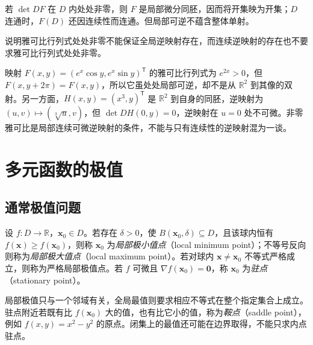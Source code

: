 若 $\det DF$ 在 $D$ 内处处非零，则 $F$ 是局部微分同胚，因而将开集映为开集；$D$ 连通时，$F(D)$ 还因连续性而连通。但局部可逆不蕴含整体单射。

\begin{example}
\label{ex:local-versus-global-invertibility-ch14}
说明雅可比行列式处处非零不能保证全局逆映射存在，而连续逆映射的存在也不要求雅可比行列式处处非零。
\end{example}
\begin{solve}
映射 $F(x,y)=(e^x\cos y,e^x\sin y)^{\mathsf T}$ 的雅可比行列式为 $e^{2x}>0$，但 $F(x,y+2\pi)=F(x,y)$，所以它虽处处局部可逆，却不是从 $\mathbb R^2$ 到其像的双射。另一方面，$H(x,y)=(x^3,y)^{\mathsf T}$ 是 $\mathbb R^2$ 到自身的同胚，逆映射为 $(u,v)\mapsto(\sqrt[3]u,v)$，但 $\det DH(0,y)=0$，逆映射在 $u=0$ 处不可微。非零雅可比是局部连续可微逆映射的条件，不能与只有连续性的逆映射混为一谈。
\end{solve}

\section{多元函数的极值}
\label{sec:extrema-of-multivariable-functions}


\subsection{通常极值问题}
\label{subsec:unconstrained-extrema}

\begin{definition}
\label{def:multivariable-local-extrema-ch14}
设 $f:D\to\mathbb R$，$\boldsymbol x_0\in D$。若存在 $\delta>0$，使 $B(\boldsymbol x_0,\delta)\subseteq D$，且该球内恒有 $f(\boldsymbol x)\geq f(\boldsymbol x_0)$，则称 $\boldsymbol x_0$ 为\emph{局部极小值点}（local minimum point）；不等号反向则称为\emph{局部极大值点}（local maximum point）。若对球内 $\boldsymbol x\ne\boldsymbol x_0$ 不等式严格成立，则称为严格局部极值点。若 $f$ 可微且 $\nabla f(\boldsymbol x_0)=\boldsymbol0$，称 $\boldsymbol x_0$ 为\emph{驻点}（stationary point）。
\end{definition}

局部极值只与一个邻域有关，全局最值则要求相应不等式在整个指定集合上成立。驻点附近若既有比 $f(\boldsymbol x_0)$ 大的值，也有比它小的值，称为\emph{鞍点}（saddle point），例如 $f(x,y)=x^2-y^2$ 的原点。闭集上的最值还可能在边界取得，不能只求内点驻点。

